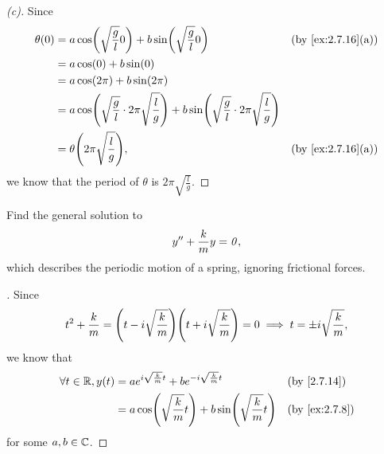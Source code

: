 \begin{proof}[(c)]
  Since
  \begin{align*}
    \theta(0) & = a \cos\pa{\sqrt{\frac{g}{l}} 0} + b \sin\pa{\sqrt{\frac{g}{l}} 0}                                                            &  & \by{ex:2.7.16}[a] \\
              & = a \cos(0) + b \sin(0)                                                                                                                               \\
              & = a \cos(2 \pi) + b \sin(2 \pi)                                                                                                                       \\
              & = a \cos\pa{\sqrt{\frac{g}{l}} \cdot 2 \pi \sqrt{\frac{l}{g}}} + b \sin\pa{\sqrt{\frac{g}{l}}  \cdot 2 \pi \sqrt{\frac{l}{g}}}                        \\
              & = \theta\pa{2 \pi \sqrt{\frac{l}{g}}},                                                                                         &  & \by{ex:2.7.16}[a]
  \end{align*}
  we know that the period of \(\theta\) is \(2 \pi \sqrt{\frac{l}{g}}\).
\end{proof}

\begin{ex}\label{ex:2.7.17}
  Find the general solution to
  \[
    y'' + \frac{k}{m} y = \mathit{0},
  \]
  which describes the periodic motion of a spring, ignoring frictional forces.
\end{ex}

\begin{proof}[]
  Since
  \[
    t^2 + \frac{k}{m} = \pa{t - i \sqrt{\frac{k}{m}}} \pa{t + i \sqrt{\frac{k}{m}}} = 0 \implies t = \pm i \sqrt{\frac{k}{m}},
  \]
  we know that
  \begin{align*}
    \forall t \in \R, y(t) & = a e^{i \sqrt{\frac{k}{m}} t} + b e^{-i \sqrt{\frac{k}{m}} t}      &  & \by{2.7.14}   \\
                           & = a \cos\pa{\sqrt{\frac{k}{m}} t} + b \sin\pa{\sqrt{\frac{k}{m}} t} &  & \by{ex:2.7.8}
  \end{align*}
  for some \(a, b \in \mathbb{C}\).
\end{proof}

